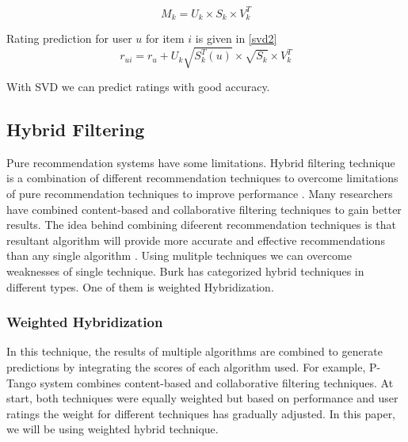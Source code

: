 \begin{equation}
M_{k} = U_{k} \times S_{k} \times V_{k}^{T} 
\label{svd1}
\end{equation}

\noindent Rating prediction for user $u$ for item $i$ is given in \autoref{svd2} \\

\begin{equation}
r_{ui} = r_{u} + U_{k} \sqrt{S_{k}^{T} (u)} \times \sqrt{S_k} \times V_{k}^{T}
\label{svd2}
\end{equation}

\noindent With SVD we can predict ratings with good accuracy.




\subsection{Hybrid Filtering}
Pure recommendation systems have some limitations. Hybrid filtering technique is a combination of different recommendation techniques to overcome limitations of pure recommendation techniques to improve performance \cite{37,38}. Many researchers have combined content-based and collaborative filtering techniques to gain better results. The idea behind combining difeerent recommendation techniques is that resultant algorithm will provide more accurate and effective recommendations than any single algorithm \cite{39}. Using mulitple techniques we can overcome weaknesses of single technique. Burk \cite{} has categorized hybrid techniques in different types. One of them is weighted Hybridization.\\

\subsubsection{Weighted Hybridization}
In this technique, the results of multiple algorithms are combined to generate predictions by integrating the scores of each algorithm used. For example, \cite{41} P-Tango system combines content-based and collaborative filtering techniques. At start, both techniques were equally weighted but based on performance and user ratings the weight for different techniques has gradually adjusted. In this paper, we will be using weighted hybrid technique.



